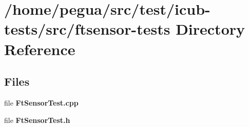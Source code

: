 \section{/home/pegua/src/test/icub-\/tests/src/ftsensor-\/tests Directory Reference}
\label{dir_58c9f48d72e7737305eca65c820f5d4c}
\subsection*{Files}
\begin{DoxyCompactItemize}
\item 
file {\bfseries Ft\-Sensor\-Test.\-cpp}
\item 
file {\bfseries Ft\-Sensor\-Test.\-h}
\end{DoxyCompactItemize}

